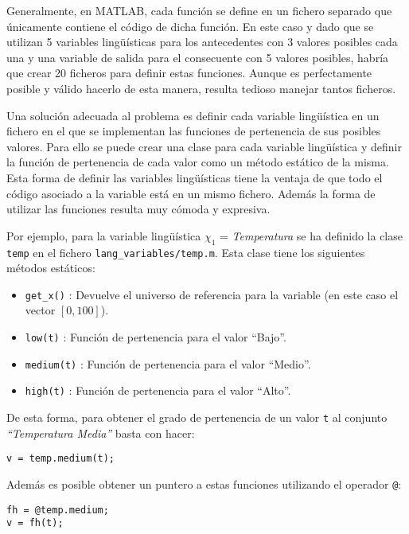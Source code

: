 Generalmente, en MATLAB, cada función se define en un fichero separado que únicamente contiene el código de dicha función. En este caso y dado que se utilizan 5 variables lingüísticas para los antecedentes con 3 valores posibles cada una y una variable de salida para el consecuente con 5 valores posibles, habría que crear 20 ficheros para definir estas funciones. Aunque es perfectamente posible y válido hacerlo de esta manera, resulta tedioso manejar tantos ficheros. 

Una solución adecuada al problema es definir cada variable lingüística en un fichero en el que se implementan las funciones de pertenencia de sus posibles valores. Para ello se puede crear una clase para cada variable lingüística y definir la función de pertenencia de cada valor como un método estático de la misma. Esta forma de definir las variables lingüísticas tiene la ventaja de que todo el código asociado a la variable está en un mismo fichero. Además la forma de utilizar las funciones resulta muy cómoda y expresiva.

Por ejemplo, para la variable lingüística $\chi_1$ = \emph{Temperatura} se ha definido la clase \lstinline|temp| en el fichero \lstinline|lang_variables/temp.m|. Esta clase tiene los siguientes métodos estáticos:
\begin{itemize}
\item \lstinline|get_x()| : Devuelve el universo de referencia para la variable (en este caso el vector $[0,100]$).
\item \lstinline|low(t)| : Función de pertenencia para el valor ``Bajo''.
\item \lstinline|medium(t)| : Función de pertenencia para el valor ``Medio''.
\item \lstinline|high(t)| : Función de pertenencia para el valor ``Alto''.
\end{itemize}

De esta forma, para obtener el grado de pertenencia de un valor \lstinline|t| al conjunto \emph{``Temperatura Media''} basta con hacer:

\begin{lstlisting}
v = temp.medium(t);
\end{lstlisting}

Además es posible obtener un puntero a estas funciones utilizando el operador \lstinline|@|:

\begin{lstlisting}
fh = @temp.medium;
v = fh(t);
\end{lstlisting}

